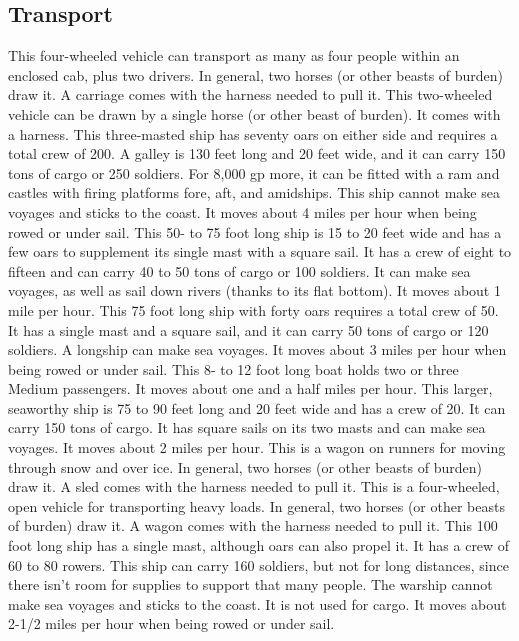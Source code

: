 \subsection{Transport}
 This four-wheeled vehicle can transport as many as four people within an enclosed cab, plus two drivers. In general, two horses (or other beasts of burden) draw it. A carriage comes with the harness needed to pull it.
 This two-wheeled vehicle can be drawn by a single horse (or other beast of burden). It comes with a harness.
 This three-masted ship has seventy oars on either side and requires a total crew of 200. A galley is 130 feet long and 20 feet wide, and it can carry 150 tons of cargo or 250 soldiers. For 8,000 gp more, it can be fitted with a ram and castles with firing platforms fore, aft, and amidships. This ship cannot make sea voyages and sticks to the coast. It moves about 4 miles per hour when being rowed or under sail.
 This 50- to 75 foot long ship is 15 to 20 feet wide and has a few oars to supplement its single mast with a square sail. It has a crew of eight to fifteen and can carry 40 to 50 tons of cargo or 100 soldiers. It can make sea voyages, as well as sail down rivers (thanks to its flat bottom). It moves about 1 mile per hour.
 This 75 foot long ship with forty oars requires a total crew of 50. It has a single mast and a square sail, and it can carry 50 tons of cargo or 120 soldiers. A longship can make sea voyages. It moves about 3 miles per hour when being rowed or under sail.
 This 8- to 12 foot long boat holds two or three Medium passengers. It moves about one and a half miles per hour.
 This larger, seaworthy ship is 75 to 90 feet long and 20 feet wide and has a crew of 20. It can carry 150 tons of cargo. It has square sails on its two masts and can make sea voyages. It moves about 2 miles per hour.
 This is a wagon on runners for moving through snow and over ice. In general, two horses (or other beasts of burden) draw it. A sled comes with the harness needed to pull it.
 This is a four-wheeled, open vehicle for transporting heavy loads. In general, two horses (or other beasts of burden) draw it. A wagon comes with the harness needed to pull it.
 This 100 foot long ship has a single mast, although oars can also propel it. It has a crew of 60 to 80 rowers. This ship can carry 160 soldiers, but not for long distances, since there isn't room for supplies to support that many people. The warship cannot make sea voyages and sticks to the coast. It is not used for cargo. It moves about 2-1/2 miles per hour when being rowed or under sail.

